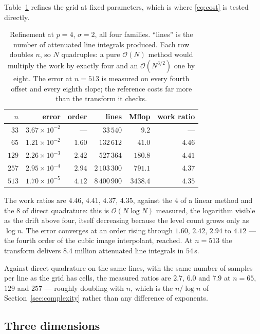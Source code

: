 \documentclass[11pt]{article}
\newcommand{\bigO}{\mathcal{O}}
\begin{document}
Table~\ref{tab:refine2d} refines the grid at fixed parameters, which is where
\eqref{eq:cost} is tested directly.

\begin{table}[t]
\centering\small
\caption{Refinement at $p=4$, $\sigma=2$, all four families. ``lines'' is the
number of attenuated line integrals produced. Each row doubles $n$, so $N$
quadruples: a pure $\bigO(N)$ method would multiply the work by exactly four and
an $\bigO(N^{3/2})$ one by eight. The error at $n=513$ is measured on every
fourth offset and every eighth slope; the reference costs far more than the
transform it checks.}
\label{tab:refine2d}
\begin{tabular}{rrr rrr}
\toprule
$n$ & error & order & lines & Mflop & work ratio\\
\midrule
$33$  & $3.67\!\times\!10^{-2}$ & ---    & $33\,540$    & $9.2$   & ---\\
$65$  & $1.21\!\times\!10^{-2}$ & $1.60$ & $132\,612$   & $41.0$  & $4.46$\\
$129$ & $2.26\!\times\!10^{-3}$ & $2.42$ & $527\,364$   & $180.8$ & $4.41$\\
$257$ & $2.95\!\times\!10^{-4}$ & $2.94$ & $2\,103\,300$ & $791.1$ & $4.37$\\
$513$ & $1.70\!\times\!10^{-5}$ & $4.12$ & $8\,400\,900$ & $3438.4$ & $4.35$\\
\bottomrule
\end{tabular}
\end{table}

The work ratios are $4.46$, $4.41$, $4.37$, $4.35$, against the $4$ of a linear
method and the $8$ of direct quadrature: this is $\bigO(N \log N)$ measured, the
logarithm visible as the drift above four, itself decreasing because the level
count grows only as $\log n$. The error converges at an order rising through
$1.60$, $2.42$, $2.94$ to $4.12$ --- the fourth order of the cubic image
interpolant, reached. At $n = 513$ the transform delivers $8.4$ million
attenuated line integrals in $54$\,s.

Against direct quadrature on the same lines, with the same number of samples
per line as the grid has cells, the measured ratios are $2.7$, $6.0$ and $7.9$
at $n = 65$, $129$ and $257$ --- roughly doubling with $n$, which is the
$n/\log n$ of Section~\ref{sec:complexity} rather than any difference of
exponents.

\subsection{Three dimensions}
\label{sec:3d}
\end{document}
